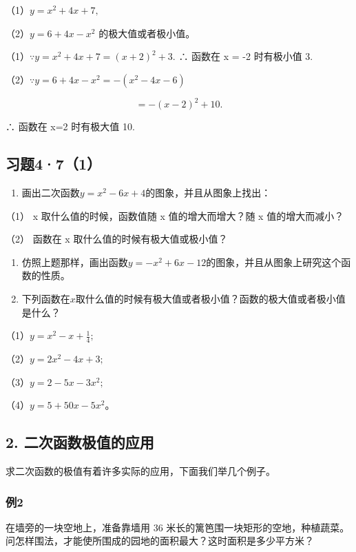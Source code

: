 （1）\(y = x^{2} + 4x + 7,\)

（2）\(y = 6 + 4x - x^2\) 的极大值或者极小值。

 （1）\(\because y = x^{2} + 4x + 7 = (x + 2)^{2} + 3.\)
∴ 函数在 x = -2 时有极小值 3.

（2）\(\because y = 6 + 4x - x^2 = -(x^2 - 4x - 6)\)

\[
= - (x - 2)^{2} + 10.
\]

∴ 函数在 x=2 时有极大值 10.

\subsection{习题4·7（1）}

\begin{enumerate}
\item
  画出二次函数\(y = x^2 - 6x + 4\)的图象，并且从图象上找出：
\end{enumerate}

（1） x 取什么值的时候，函数值随 x 值的增大而增大？随 x 值的增大而减小？

（2） 函数在 x 取什么值的时候有极大值或极小值？

\begin{enumerate}[start=2]
\item
  仿照上题那样，画出函数\(y = -x^2 + 6x - 12\)的图象，并且从图象上研究这个函数的性质。
\item
  下列函数在\(x\)取什么值的时候有极大值或者极小值？函数的极大值或者极小值是什么？
\end{enumerate}

（1）\(y = x^{2} - x + \frac{1}{4};\)

（2）\(y = 2x^{2} - 4x + 3;\)

（3）\(y = 2 - 5x - 3x^2;\)

（4）\(y = 5 + 50x - 5x^2\)。

\subsection{2. 二次函数极值的应用}

求二次函数的极值有着许多实际的应用，下面我们举几个例子。

\subsubsection{例2}

在墙旁的一块空地上，准备靠墙用 36
米长的篱笆围一块矩形的空地，种植蔬菜。问怎样围法，才能使所围成的园地的面积最大？这时面积是多少平方米？

